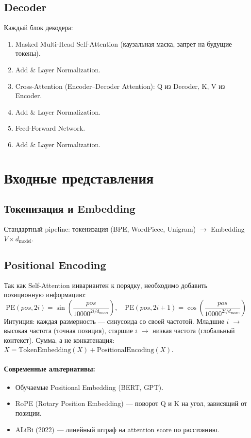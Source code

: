 \documentclass[a4paper,12pt]{article}
\begin{document}
\subsection{Decoder}
Каждый блок декодера:
\begin{enumerate}
    \item Masked Multi-Head Self-Attention (каузальная маска, запрет на будущие токены).
    \item Add \& Layer Normalization.
    \item Cross-Attention (Encoder--Decoder Attention): Q из Decoder, K, V из Encoder.
    \item Add \& Layer Normalization.
    \item Feed-Forward Network.
    \item Add \& Layer Normalization.
\end{enumerate}

\section{Входные представления}

\subsection{Токенизация и Embedding}
Стандартный pipeline: токенизация (BPE, WordPiece, Unigram) $\to$ Embedding $V \times d_{\text{model}}$.

\subsection{Positional Encoding}
Так как Self-Attention инвариантен к порядку, необходимо добавить позиционную информацию:
\[
\text{PE}(pos, 2i) = \sin\left(\frac{pos}{10000^{2i/d_{\text{model}}}}\right), \quad
\text{PE}(pos, 2i+1) = \cos\left(\frac{pos}{10000^{2i/d_{\text{model}}}}\right)
\]
Интуиция: каждая размерность — синусоида со своей частотой. Младшие $i$ $\to$ высокая частота (точная позиция), старшие $i$ $\to$ низкая частота (глобальный контекст). Сумма, а не конкатенация: $X = \text{TokenEmbedding}(X) + \text{PositionalEncoding}(X)$.

\paragraph{Современные альтернативы:}
\begin{itemize}
    \item Обучаемые Positional Embedding (BERT, GPT).
    \item RoPE (Rotary Position Embedding) — поворот Q и K на угол, зависящий от позиции.
    \item ALiBi (2022) — линейный штраф на attention score по расстоянию.
\end{itemize}
\end{document}
